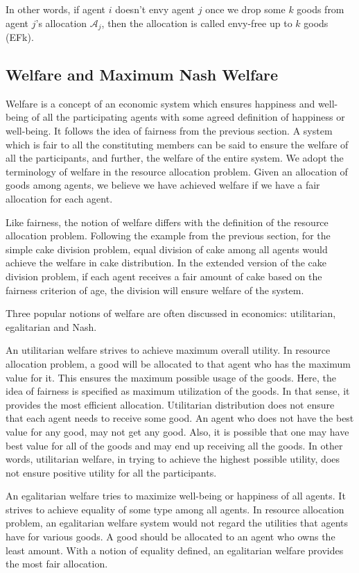 In other words, if agent $i$ doesn't envy agent $j$ once we drop some $k$ goods from agent $j$'s allocation $\mathcal{A}_j$, then the allocation is called envy-free up to $k$ goods (EFk).


\subsection{Welfare and Maximum Nash Welfare}
Welfare is a concept of an economic system which ensures happiness and well-being of all the participating agents with some agreed definition of happiness or well-being. It follows the idea of fairness from the previous section. A system which is fair to all the constituting members can be said to ensure the welfare of all the participants, and further, the welfare of the entire system. We adopt the terminology of welfare in the resource allocation problem. Given an allocation of goods among agents, we believe we have achieved welfare if we have a fair allocation for each agent.

Like fairness, the notion of welfare differs with the definition of the resource allocation problem. Following the example from the previous section, for the simple cake division problem, equal division of cake among all agents would achieve the welfare in cake distribution. In the extended version of the cake division problem, if each agent receives a fair amount of cake based on the fairness criterion of age, the division will ensure welfare of the system.

Three popular notions of welfare are often discussed in economics: utilitarian, egalitarian and Nash.

An utilitarian welfare strives to achieve maximum overall utility. In resource allocation problem, a good will be allocated to that agent who has the maximum value for it. This ensures the maximum possible usage of the goods. Here, the idea of fairness is specified as maximum utilization of the goods. In that sense, it provides the most efficient allocation. Utilitarian distribution does not ensure that each agent needs to receive some good. An agent who does not have the best value for any good, may not get any good. Also, it is possible that one may have best value for all of the goods and may end up receiving all the goods. In other words, utilitarian welfare, in trying to achieve the highest possible utility, does not ensure positive utility for all the participants.

An egalitarian welfare tries to maximize well-being or happiness of all agents. It strives to achieve equality of some type among all agents. In resource allocation problem, an egalitarian welfare system would not regard the utilities that agents have for various goods. A good should be allocated to an agent who owns the least amount. With a notion of equality defined, an egalitarian welfare provides the most fair allocation.

